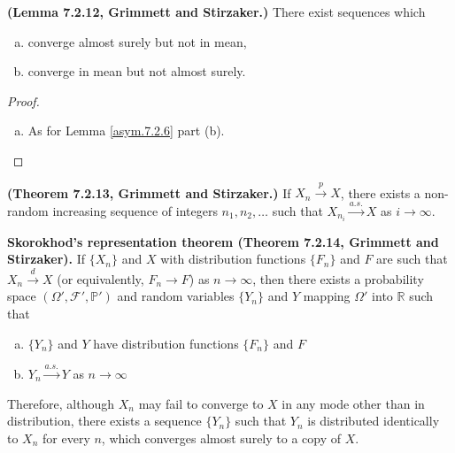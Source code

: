 \begin{lemma}\textbf{(Lemma 7.2.12, Grimmett and Stirzaker.)} There exist sequences which

\begin{enumerate}[(a)]
\item converge almost surely but not in mean,
\item converge in mean but not almost surely.
\end{enumerate}
\end{lemma}
\begin{proof}
\begin{enumerate}[(a)]

\item As for Lemma \ref{asym.7.2.6} part (b).
\end{enumerate}
\end{proof}

\begin{theorem} \textbf{(Theorem 7.2.13, Grimmett and Stirzaker.)} If \(X_n \xrightarrow{p} X\), there exists a non-random increasing sequence of integers \(n_1, n_2, \ldots\) such that \(X_{n_i} \xrightarrow{a.s.} X\) as \(i \to \infty\). \end{theorem}

\begin{theorem}\textbf{Skorokhod's representation theorem (Theorem 7.2.14, Grimmett and Stirzaker).} If \(\{X_n\}\) and \(X\) with distribution functions \(\{F_n\}\) and \(F\) are such that \(X_n \xrightarrow{d} X\) (or equivalently, \(F_n \to F\)) as \(n \to \infty\), then there exists a probability space \((\Omega', \mathcal{F}', \mathbb{P}')\) and random variables \(\{Y_n\}\) and \(Y\) mapping \(\Omega'\) into \(\mathbb{R}\) such that

\begin{enumerate}[(a)]

\item \(\{Y_n\}\) and \(Y\) have distribution functions \(\{F_n\}\) and \(F\)

\item \(Y_n \xrightarrow{a.s.} Y\) as \(n \to \infty\)

\end{enumerate}

Therefore, although \(X_n\) may fail to converge to \(X\) in any mode other than in distribution, there exists a sequence \(\{Y_n\}\) such that \(Y_n\) is distributed identically to \(X_n\) for every \(n\), which converges almost surely to a copy of \(X\).
\end{theorem}



